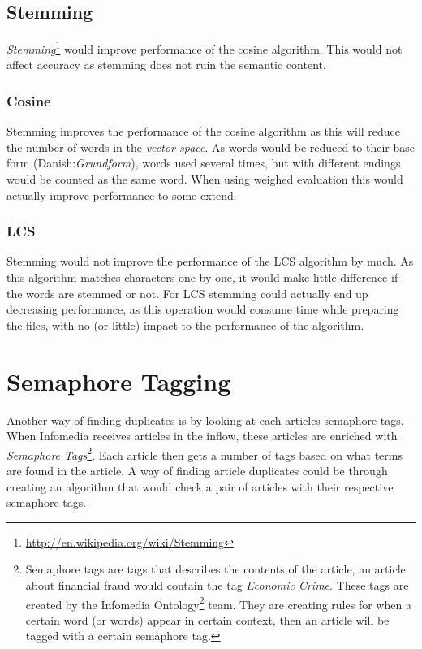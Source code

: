\subsection{Stemming}
\textit{Stemming}\footnote{\url{http://en.wikipedia.org/wiki/Stemming}} would improve performance of the cosine algorithm. This would not affect accuracy as stemming does not ruin the semantic content.

\subsubsection{Cosine}
Stemming improves the performance of the cosine algorithm as this will reduce the number of words in the \textit{vector space}. As words would be reduced to their base form (Danish:\textit{Grundform}), words used several times, but with different endings would be counted as the same word. When using weighed evaluation this would actually improve performance to some extend.

\subsubsection{LCS}
Stemming would not improve the performance of the LCS algorithm by much. As this algorithm matches characters one by one, it would make little difference if the words are stemmed or not. For LCS stemming could actually end up decreasing performance, as this operation would consume time while preparing the files, with no (or little) impact to the performance of the algorithm.

\section{Semaphore Tagging}
Another way of finding duplicates is by looking at each articles semaphore tags. When Infomedia receives articles in the inflow, these articles are enriched with \textit{Semaphore Tags}\footnote{Semaphore tags are tags that describes the contents of the article, an article about financial fraud would contain the tag \textit{Economic Crime}. These tags are created by the Infomedia Ontology\footnote{\url{http://en.wikipedia.org/wiki/Ontology_(information_science)}} team. They are creating rules for when a certain word (or words) appear in certain context, then an article will be tagged with a certain semaphore tag.}. Each article then gets a number of tags based on what terms are found in the article. A way of finding article duplicates could be through creating an algorithm that would check a pair of articles with their respective semaphore tags.

